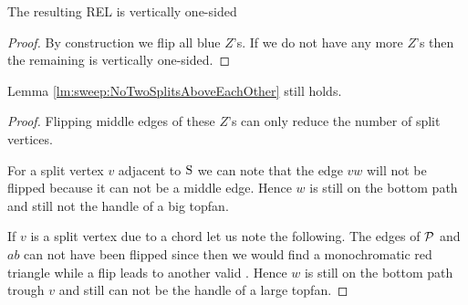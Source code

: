   \begin{lemma}
    \label{lm:sweep:vertOnsided}
    The resulting REL is vertically one-sided
  \end{lemma}
  \begin{proof}
    By construction we flip all blue $Z$'s. If we do not have any more $Z$'s then the remaining \rel is vertically one-sided. 
  \end{proof}

  \begin{lemma}
    \label{lm:sweep:NoTwoSplitsAboveEachOtherVertOnesided}
    Lemma \ref{lm:sweep:NoTwoSplitsAboveEachOther} still holds.
  \end{lemma}

  \begin{proof}
    Flipping middle edges of these $Z$'s  can only reduce the number of split vertices.

    For a split vertex $v$ adjacent to $\pS$ we can note that the edge $vw$ will not be flipped because it can not be a middle edge. Hence $w$ is still on the bottom path and still not the handle of a big topfan.

    If $v$ is a split vertex due to a chord let us note the following.
    The edges of $\P$ and $ab$ can not have been flipped since then we would find a monochromatic red triangle while a flip leads to another valid \rel. Hence $w$ is still on the bottom path trough $v$ and still can not be the handle of a large topfan.
  \end{proof}
